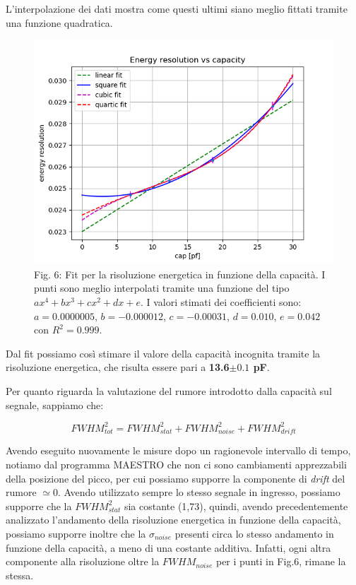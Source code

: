 \documentclass[a4paper]{article}
\begin{document}
L'interpolazione dei dati mostra come questi ultimi siano meglio fittati tramite una funzione quadratica.

\begin{figure}[H]
\includegraphics[width=1\textwidth]{resvvscapacity}
        \caption{Fig. 6: Fit per la risoluzione energetica in funzione della capacità. I punti sono meglio interpolati tramite una funzione del tipo $ax^4+bx^3+cx^2+dx+e$. I valori stimati dei coefficienti sono: $a = 0.0000005$, $b = -0.000012$, $c = -0.00031$, $d=0.010$, $e=0.042$ con $R^2 = 0.999$.}
        \label{fig:6}
\end{figure}

\newpage

Dal fit possiamo così stimare il valore della capacità incognita tramite la risoluzione energetica, che risulta essere pari a \textbf{13.6$\pm0.1$ pF}.


Per quanto riguarda la valutazione del rumore introdotto dalla capacità sul segnale, sappiamo che:

     \begin{equation}
     FWHM_{tot}^2=FWHM_{stat}^2+FWHM_{noise}^2+FWHM_{drift}^2
     \end{equation}
     
Avendo eseguito nuovamente le misure dopo un ragionevole intervallo di tempo, notiamo dal programma MAESTRO che non ci sono cambiamenti apprezzabili della posizione del picco, per cui possiamo supporre la componente di \emph{drift} del rumore $\simeq 0$.
Avendo utilizzato sempre lo stesso segnale in ingresso, possiamo supporre che la $FWHM_{stat}^2$ sia costante (1,73), quindi, avendo precedentemente analizzato l'andamento della risoluzione energetica in funzione della capacità, possiamo supporre inoltre che la $\sigma_{noise}$ presenti circa lo stesso andamento in funzione della capacità, a meno di una costante additiva. Infatti, ogni altra componente alla risoluzione oltre la $FWHM_{noise}$ per i punti in Fig.6, rimane la stessa.
\end{document}
